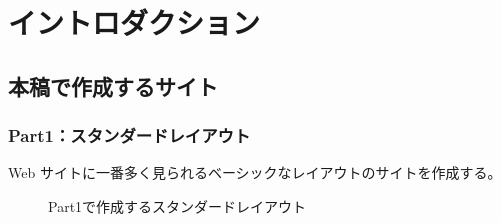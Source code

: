 \part{イントロダクション}
\chapter{本稿で作成するサイト}
\section{Part1：スタンダードレイアウト}
Web サイトに一番多く見られるベーシックなレイアウトのサイトを作成する。
\vspc{-5.00pt}\begin{figure}[H]\centering{}\caption{Part1で作成するスタンダードレイアウト}\label{Part1で作成するスタンダードレイアウト}\end{figure}
